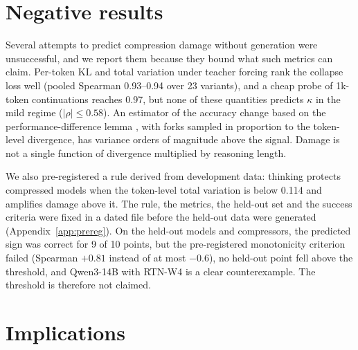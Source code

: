 \documentclass[10pt]{article}
\begin{document}
\section{Negative results}
\label{sec:negative}

Several attempts to predict compression damage without generation were unsuccessful, and we report them because they bound what such metrics can claim. Per-token KL and total variation under teacher forcing rank the collapse loss well (pooled Spearman 0.93--0.94 over 23 variants), and a cheap probe of 1k-token continuations reaches 0.97, but none of these quantities predicts $\kappa$ in the mild regime ($|\rho|\le0.58$). An estimator of the accuracy change based on the performance-difference lemma \citep{kakade2002approximately}, with forks sampled in proportion to the token-level divergence, has variance orders of magnitude above the signal. Damage is not a single function of divergence multiplied by reasoning length.

We also pre-registered a rule derived from development data: thinking protects compressed models when the token-level total variation is below 0.114 and amplifies damage above it. The rule, the metrics, the held-out set and the success criteria were fixed in a dated file before the held-out data were generated (Appendix~\ref{app:prereg}). On the held-out models and compressors, the predicted sign was correct for 9 of 10 points, but the pre-registered monotonicity criterion failed (Spearman $+0.81$ instead of at most $-0.6$), no held-out point fell above the threshold, and Qwen3-14B with RTN-W4 is a clear counterexample. The threshold is therefore not claimed.

\section{Implications}
\end{document}
